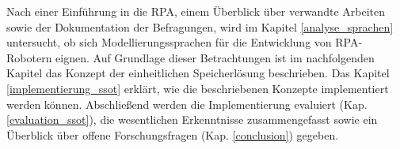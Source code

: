 Nach einer Einführung in die RPA, einem Überblick über verwandte Arbeiten sowie der Dokumentation der Befragungen, wird im Kapitel \ref{analyse_sprachen} untersucht, ob sich Modellierungssprachen  für die Entwicklung von RPA-Robotern eignen. Auf Grundlage dieser Betrachtungen ist im nachfolgenden Kapitel das Konzept der einheitlichen Speicherlösung beschrieben. Das Kapitel \ref{implementierung_ssot} erklärt, wie die beschriebenen Konzepte implementiert werden können. Abschließend werden die Implementierung evaluiert (Kap. \ref{evaluation_ssot}), die wesentlichen Erkenntnisse zusammengefasst sowie ein Überblick über offene Forschungsfragen (Kap. \ref{conclusion}) gegeben. 
